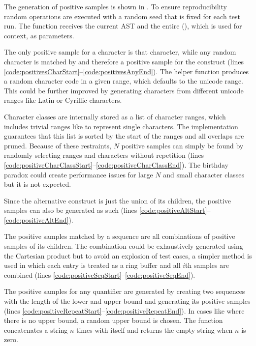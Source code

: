 The generation of positive samples is shown in . To ensure reproducibility random operations are executed with a random seed that is fixed for each test run. The function receives the current AST  and the entire  (), which is used for context, as parameters.

The only positive sample for a character is that character, while any random character is matched by and therefore a positive sample for the  construct (lines \ref{code:positivesCharStart}--\ref{code:positivesAnyEnd}). The helper function  produces a random character code in a given range, which defaults to the unicode range. This could be further improved by generating characters from different unicode ranges like Latin or Cyrillic characters.

Character classes are internally stored as a list of character ranges, which includes trivial ranges like \pattern{[a-a]} to represent single characters. The implementation guarantees that this list is sorted by the start of the ranges and all overlaps are pruned. Because of these restraints, $N$ positive samples can simply be found by randomly selecting ranges and characters without repetition (lines \ref{code:positiveCharClassStart}--\ref{code:positiveCharClassEnd}). The birthday paradox could create performance issues for large $N$ and small character classes but it is not expected.

Since the alternative construct is just the union of its children, the positive samples can also be generated as such (lines \ref{code:positiveAltStart}--\ref{code:positiveAltEnd}).

The positive samples matched by a sequence are all combinations of positive samples of its children. The combination could be exhaustively generated using the Cartesian product but to avoid an explosion of test cases, a simpler method is used in which each entry is treated as a ring buffer and all $i$th samples are combined (lines \ref{code:positiveSeqStart}--\ref{code:positiveSeqEnd}).

The positive samples for any quantifier are generated by creating two sequences with the length of the lower and upper bound and generating its positive samples (lines \ref{code:positiveRepeatStart}--\ref{code:positiveRepeatEnd}). In cases like  where there is no upper bound, a random upper bound is chosen. The function  concatenates a string $n$ times with itself and returns the empty string when $n$ is zero.

